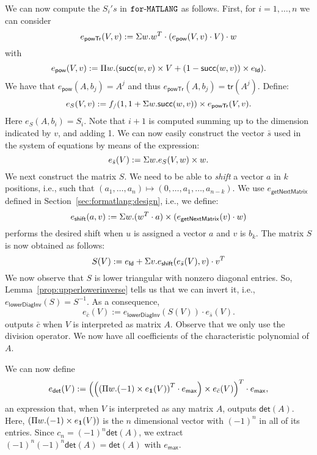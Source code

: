     We can now compute the $S_i's$ in $\texttt{for}\text{-}\texttt{MATLANG}$ as follows. First, for
    $i=1,\ldots,n$ we can consider
    $$
    e_{\mathsf{powTr}}(V,v):=\Sigma w. w^T\cdot\left(e_{\mathsf{pow}}(V,v)\cdot V\right)\cdot w
    $$
    with 
    $$
    e_{\mathsf{pow}}(V,v):= \Pi w. (\mathsf{succ}(w,v)\times V+(1-\mathsf{succ}(w,v))\times e_{\mathsf{Id}}).
    $$
    We have that $e_{\mathsf{pow}}(A,b_j)=A^{j}$ and thus $e_{\mathsf{powTr}}(A,b_j)=\mathsf{tr}(A^{j})$. Define:
    $$
    e_{S}(V,v):=f_{/}(1, 1 + \Sigma w. \mathsf{succ}(w,v))\times e_{\mathsf{powTr}}(V,v).
    $$
    Here $e_{S}(A,b_i)=S_i$. Note that $i+1$ is computed summing up to the dimension indicated by $v$, and adding 1.
    We can now easily construct the vector $\bar s$ used in the system of equations by means of the expression:
    $$
    e_{\bar s}(V):=\Sigma w.e_{S}(V,w)\times w.
    $$
    We next construct the matrix $S$. We need to be able to \textit{shift} a vector $a$ in $k$ positions, i.e.,
    such that $(a_1,\ldots,a_n)\mapsto (0,\ldots,a_1,\ldots,a_{n-k})$. We use $e_{\mathsf{getNextMatrix}}$ 
    defined in Section~\ref{sec:formatlang:design}, i.e., we define:
    $$
    e_{\mathsf{shift}}(a,v):=\Sigma w.(w^T\cdot a)\times(e_{\mathsf{getNextMatrix}}(v)\cdot w)
    $$
    performs the desired shift when $u$ is assigned a vector $a$ and $v$ is $b_k$. 
    The matrix $S$ is now obtained as follows:
    $$
    S(V):= e_{\mathsf{Id}} + \Sigma v. e_{\mathsf{shift}}(e_{\bar s}(V), v)\cdot v^T
    $$
    We now observe that $S$ is lower triangular with nonzero diagonal entries. So,
    Lemma~\ref{prop:upperlowerinverse} tells us that we can invert it, i.e.,
    $e_{\mathsf{lowerDiagInv}}(S)=S^{-1}$. As a consequence,
    $$
    e_{\bar c}(V):=e_{\mathsf{lowerDiagInv}}(S(V))\cdot e_{\bar s}(V).
    $$
    outputs $\bar c$ when $V$ is interpreted as matrix $A$. Observe that we only use the division operator. We now have all coefficients of the characteristic polynomial of $A$.


    We can now define
    $$
    e_{\mathsf{det}}(V):=\left( \left(\left( \Pi w. (-1)\times e_{\mathbf{1}}(V)\right)^T\cdot e_{\mathsf{max}}\right) \times e_{\bar c}(V) \right)^T\cdot e_{\mathsf{max}},
    $$
    an expression that, when $V$ is interpreted as any matrix $A$, outputs $\mathsf{det}(A)$.
    Here, $(\Pi w. (-1)\times e_{\mathbf{1}}(V))$ is the $n$ dimensional vector with $(-1)^n$ in all of its entries.
    Since $c_n=(-1)^n\mathsf{det}(A)$, we extract $(-1)^n(-1)^n\mathsf{det}(A)=\mathsf{det}(A)$ with $e_{\mathsf{max}}$.

